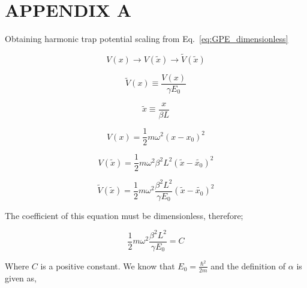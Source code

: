 \documentclass[a4paper,times,hidelinks,12pt]{article}
\begin{document}
\clearpage

\clearpage






\appendix
\section{APPENDIX A}
\label{ap:scale}

Obtaining harmonic trap potential scaling from Eq.~\eqref{eq:GPE_dimensionless}

\begin{equation}
\label{eq:GPESCALE_harmonic_potential_transform}
    V(x) \rightarrow V(\widetilde{x}) \rightarrow \widetilde{V}(\widetilde{x})
\end{equation}

\begin{equation}
\label{eq:GPESCALE_dimensionless_harmonic_potential}
    \widetilde{V}(x) \equiv \frac{V(x)}{\gamma E_0}
\end{equation}

\begin{equation}
\label{eq:GPESCALE_dimensionless_length}
    \widetilde{x} \equiv \frac{x}{\beta L} 
\end{equation}

\begin{equation}
\label{eq:GPESCALE_harmonic_potential}
    V(x) = \frac{1}{2}m\omega^2 (x-x_0)^2
\end{equation}

\begin{equation}
\label{eq:GPESCALE_harmonic_length_transform}
    V(\widetilde{x}) = \frac{1}{2}m\omega^2 \beta^2 L^2 (\widetilde{x}-\widetilde{x_0})^2
\end{equation}

\begin{equation}
\label{eq:GPESCALE_harmonic_energy_transform}
    \widetilde{V}(\widetilde{x}) = \frac{1}{2} m\omega^2 \frac{\beta^2 L^2}{\gamma E_0} (\widetilde{x}-\widetilde{x_0})^2  
\end{equation}

\noindent The coefficient of this equation must be dimensionless, therefore;

\begin{equation}
\label{eq:GPESCALE_harmonic_coeff}
    \frac{1}{2} m\omega^2 \frac{\beta^2 L^2}{\gamma E_0} = C
\end{equation}

\noindent Where $C$ is a positive constant. We know that $E_0 = \frac{\hbar^2}{2m}$ and the definition of $\alpha$ is given as,
\end{document}
